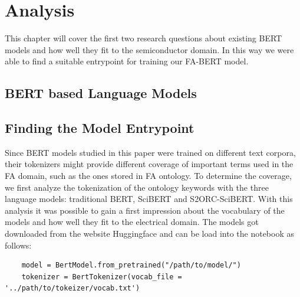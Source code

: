 \chapter{Analysis} \label{chapter:analysis}
This chapter will cover the first two research questions about existing BERT models and how well they fit to the semiconductor domain. In this way we were able to find a suitable entrypoint for training our FA-BERT model.
\section{BERT based Language Models}

\section{Finding the Model Entrypoint}
Since BERT models studied in this paper were trained on different text corpora, their tokenizers might provide different coverage of important terms used in the FA domain, such as the ones stored in FA ontology. To determine the coverage, we first analyze the tokenization of the ontology keywords with the three language models: traditional BERT, SciBERT and S2ORC-SciBERT. With this analysis it was possible to gain a first impression about the vocabulary of the models and how well they fit to the electrical domain. \newline
The models got downloaded from the website \alert{Huggingface} and can be load into the notebook as follows:
\begin{verbatim}
	model = BertModel.from_pretrained("/path/to/model/")
	tokenizer = BertTokenizer(vocab_file = '../path/to/tokeizer/vocab.txt')
\end{verbatim}

